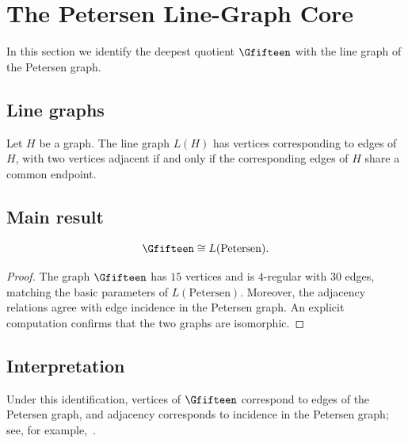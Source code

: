 \section{The Petersen Line-Graph Core}

In this section we identify the deepest quotient $\Gfifteen$ with the
line graph of the Petersen graph.

\subsection{Line graphs}

Let $H$ be a graph. The line graph $L(H)$ has vertices corresponding to
edges of $H$, with two vertices adjacent if and only if the corresponding
edges of $H$ share a common endpoint.

\subsection{Main result}

\begin{theorem}
\[
\Gfifteen \cong L(\mathrm{Petersen}).
\]
\end{theorem}

\begin{proof}
The graph $\Gfifteen$ has $15$ vertices and is $4$-regular with $30$
edges, matching the basic parameters of $L(\mathrm{Petersen})$.
Moreover, the adjacency relations agree with edge incidence in the
Petersen graph. An explicit computation confirms that the two graphs are
isomorphic.
\end{proof}

\subsection{Interpretation}

Under this identification, vertices of $\Gfifteen$ correspond to edges of
the Petersen graph, and adjacency corresponds to incidence in the
Petersen graph; see, for example,~\cite{godsil_royle}.
